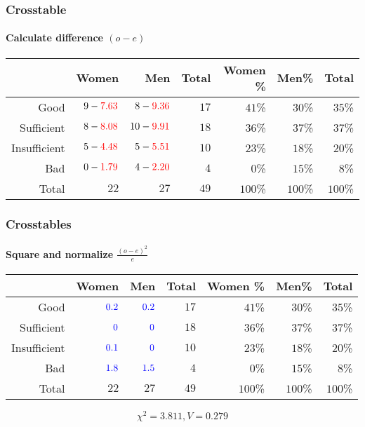 \documentclass[aspectratio=169]{beamer}
\begin{document}
\begin{frame}
  \frametitle{Crosstable}
  \framesubtitle{Calculate difference $(o - e)$}
  
  \begin{adjustwidth}{-1.5em}{-1.5em}
    \begin{table}[h] \centering
      \begin{tabular}{@{}rrrrrrr@{}} \toprule
        & Women    & Men  &  Total   & Women \% & Men\%   & Total  \\ \midrule
        Good         & $9 -\textcolor{red}{7.63}$     & $8 - \textcolor{red}{9.36}$   & $17$     & $41$\%  & $30$\% & $35$\% \\
        Sufficient   & $8 - \textcolor{red}{8.08}$   & $10 - \textcolor{red}{9.91}$  & $18$     & $36$\%  & $37$\%    & $37$\% \\
        Insufficient & $5 - \textcolor{red}{4.48}$    & $5 - \textcolor{red}{5.51}$  & $10$     & $23$\%  & $18$\% & $20$\% \\
        Bad          & $0 - \textcolor{red}{1.79}$    & $4 - \textcolor{red}{2.20}$  & $4$      & $0$\%      & $15$\% & $8$\%  \\
        Total        & $22$    & $27$  & $49$     & $100$\%    & $100$\%   & $100$\%   \\
        \bottomrule
      \end{tabular}
    \end{table}
  \end{adjustwidth}
\end{frame}

\begin{frame}
  \frametitle{Crosstables}
  \framesubtitle{Square and normalize $\frac{(o-e)^2}{e}$}
  
  \begin{table}[h] \centering
    \begin{tabular}{@{}rrrrrrr@{}} \toprule
      & Women    & Men  &  Total   & Women \% & Men\%   & Total  \\
      \midrule
      Good         & $\textcolor{blue}{0.2}$ & $\textcolor{blue}{0.2}$ & $17$   & $41$\%   & $30$\%  & $35$\% \\
      Sufficient   & $\textcolor{blue}{0}$   & $\textcolor{blue}{0}$   & $18$   & $36$\%   & $37$\%  & $37$\% \\
      Insufficient & $\textcolor{blue}{0.1}$ & $\textcolor{blue}{0}$   & $10$   & $23$\%   & $18$\%  & $20$\% \\
      Bad          & $\textcolor{blue}{1.8}$ & $\textcolor{blue}{1.5}$ & $4$    & $0$\%    & $15$\%  & $8$\%  \\
      Total        & $22$                    & $27$                    & $49$   & $100$\%  & $100$\% & $100$\%   \\
      \bottomrule
    \end{tabular}
  \end{table}
  \[ \chi^{2} = 3.811, V= 0.279 \]
\end{frame}
\end{document}
